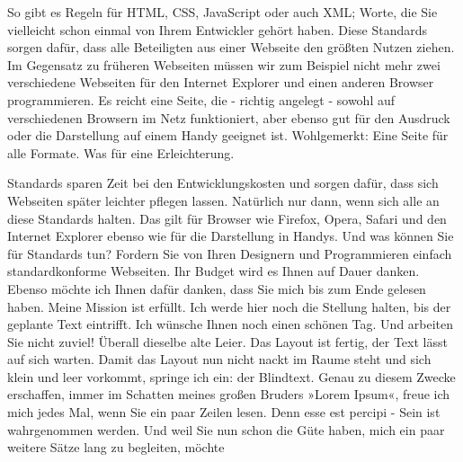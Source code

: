 So gibt es Regeln für HTML, CSS, JavaScript oder auch XML; Worte, die Sie vielleicht schon einmal von Ihrem Entwickler gehört haben. Diese Standards sorgen dafür, dass alle Beteiligten aus einer Webseite den größten Nutzen ziehen. Im Gegensatz zu früheren Webseiten müssen wir zum Beispiel nicht mehr zwei verschiedene Webseiten für den Internet Explorer und einen anderen Browser programmieren. Es reicht eine Seite, die - richtig angelegt - sowohl auf verschiedenen Browsern im Netz funktioniert, aber ebenso gut für den Ausdruck oder die Darstellung auf einem Handy geeignet ist. Wohlgemerkt: Eine Seite für alle Formate. Was für eine Erleichterung.

Standards sparen Zeit bei den Entwicklungskosten und sorgen dafür, dass sich Webseiten später leichter pflegen lassen. Natürlich nur dann, wenn sich alle an diese Standards halten. Das gilt für Browser wie Firefox, Opera, Safari und den Internet Explorer ebenso wie für die Darstellung in Handys. Und was können Sie für Standards tun? Fordern Sie von Ihren Designern und Programmieren einfach standardkonforme Webseiten. Ihr Budget wird es Ihnen auf Dauer danken. Ebenso möchte ich Ihnen dafür danken, dass Sie mich bis zum Ende gelesen haben. Meine Mission ist erfüllt. Ich werde hier noch die Stellung halten, bis der geplante Text eintrifft. Ich wünsche Ihnen noch einen schönen Tag. Und arbeiten Sie nicht zuviel! Überall dieselbe alte Leier. Das Layout ist fertig, der Text lässt auf sich warten. Damit das Layout nun nicht nackt im Raume steht und sich klein und leer vorkommt, springe ich ein: der Blindtext. Genau zu diesem Zwecke erschaffen, immer im Schatten meines großen Bruders »Lorem Ipsum«, freue ich mich jedes Mal, wenn Sie ein paar Zeilen lesen. Denn esse est percipi - Sein ist wahrgenommen werden. Und weil Sie nun schon die Güte haben, mich ein paar weitere Sätze lang zu begleiten, möchte
